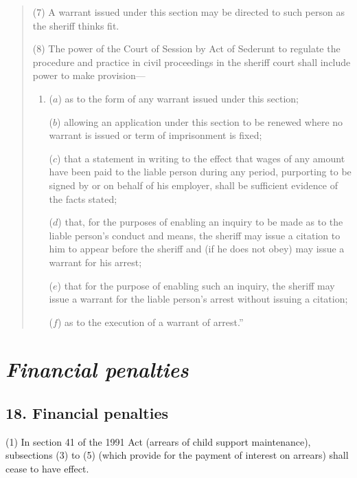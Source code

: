 \documentclass[12pt,a4paper]{article}
\begin{document}
\begin{quotation}
(7) A warrant issued under this section may be directed to such person as the sheriff thinks fit.

(8) The power of the Court of Session by Act of Sederunt to regulate the procedure and practice in civil proceedings in the sheriff court shall include power to make provision—
\begin{enumerate}\item[]
($a$) as to the form of any warrant issued under this section;

($b$) allowing an application under this section to be renewed where no warrant is issued or term of imprisonment is fixed;

($c$) that a statement in writing to the effect that wages of any amount have been paid to the liable person during any period, purporting to be signed by or on behalf of his employer, shall be sufficient evidence of the facts stated;

($d$) that, for the purposes of enabling an inquiry to be made as to the liable person’s conduct and means, the sheriff may issue a citation to him to appear before the sheriff and (if he does not obey) may issue a warrant for his arrest;

($e$) that for the purpose of enabling such an inquiry, the sheriff may issue a warrant for the liable person’s arrest without issuing a citation;

($f$) as to the execution of a warrant of arrest.”
\end{enumerate}
\end{quotation}


\section{\itshape Financial penalties}

\subsection{18. Financial penalties}

(1) In section 41 of the 1991 Act (arrears of child support maintenance), subsections (3)  to (5)  (which provide for the payment of interest on arrears) shall cease to have effect.
\end{document}
